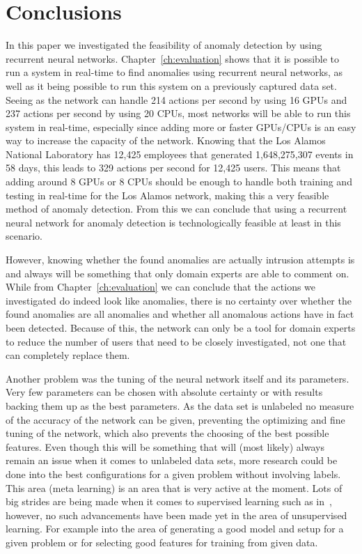 \chapter{Conclusions}\label{ch:conclusions}

In this paper we investigated the feasibility of anomaly detection by using recurrent neural networks. Chapter~\ref{ch:evaluation} shows that it is possible to run a system in real-time to find anomalies using recurrent neural networks, as well as it being possible to run this system on a previously captured data set. Seeing as the network can handle 214 actions per second by using 16 GPUs and 237 actions per second by using 20 CPUs, most networks will be able to run this system in real-time, especially since adding more or faster GPUs/CPUs is an easy way to increase the capacity of the network. Knowing that the Los Alamos National Laboratory has 12,425 employees that generated 1,648,275,307 events in 58 days, this leads to 329 actions per second for 12,425 users. This means that adding around 8 GPUs or 8 CPUs should be enough to handle both training and testing in real-time for the Los Alamos network, making this a very feasible method of anomaly detection. From this we can conclude that using a recurrent neural network for anomaly detection is technologically feasible at least in this scenario. 

However, knowing whether the found anomalies are actually intrusion attempts is and always will be something that only domain experts are able to comment on. While from Chapter~\ref{ch:evaluation} we can conclude that the actions we investigated do indeed look like anomalies, there is no certainty over whether the found anomalies are all anomalies and whether all anomalous actions have in fact been detected. Because of this, the network can only be a tool for domain experts to reduce the number of users that need to be closely investigated, not one that can completely replace them. 

Another problem was the tuning of the neural network itself and its parameters. Very few parameters can be chosen with absolute certainty or with results backing them up as the best parameters. As the data set is unlabeled no measure of the accuracy of the network can be given, preventing the optimizing and fine tuning of the network, which also prevents the choosing of the best possible features. Even though this will be something that will (most likely) always remain an issue when it comes to unlabeled data sets, more research could be done into the best configurations for a given problem without involving labels. This area (meta learning) is an area that is very active at the moment. Lots of big strides are being made when it comes to supervised learning such as in~\cite{zoph2016neural}, however, no such advancements have been made yet in the area of unsupervised learning. For example into the area of generating a good model and setup for a given problem or for selecting good features for training from given data.